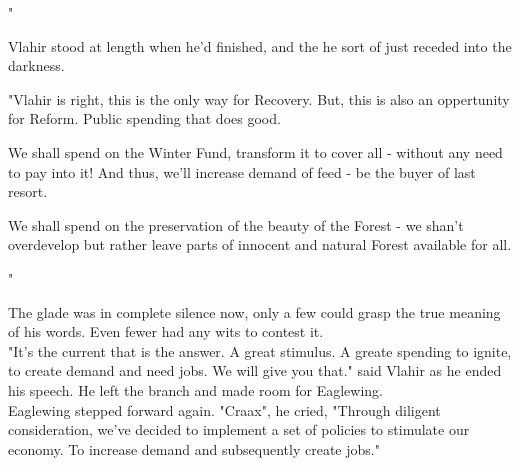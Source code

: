 "

Vlahir stood at length when he'd finished, and the he sort of just receded into the darkness. %

"Vlahir is right, this is the only way for Recovery. But, this is also an oppertunity for Reform. Public spending that does good. 

We shall spend on the Winter Fund, transform it to cover all - without any need to pay into it! And thus, we'll increase demand of feed - be the buyer of last resort.

We shall spend on the preservation of the beauty of the Forest - we shan't overdevelop but rather leave parts of innocent and natural Forest available for all.

"





The glade was in complete silence now, only a few could grasp the true meaning of his words. Even fewer had any wits to contest it. \\

"It's the current that is the answer. A great stimulus. A greate spending to ignite, to create demand and need jobs. We will give you that." said Vlahir as he ended his speech. He left the branch and made room for Eaglewing.\\

Eaglewing stepped forward again. "Craax", he cried, "Through diligent consideration, we've decided to implement a set of policies to stimulate our economy. To increase demand and subsequently create jobs."


